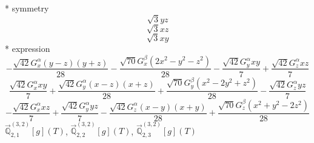 \documentclass[fleqn,8pt]{jsarticle}
\begin{document}
\noindent\quad ** symmetry
\begin{dmath*}
\sqrt{3} y z
\end{dmath*}
\begin{dmath*}
\sqrt{3} x z
\end{dmath*}
\begin{dmath*}
\sqrt{3} x y
\end{dmath*}
\noindent\quad ** expression
\begin{dmath*}
- \frac{\sqrt{42} G_{x}^{\alpha} \left(y - z\right) \left(y + z\right)}{28} - \frac{\sqrt{70} G_{x}^{\beta} \left(2 x^{2} - y^{2} - z^{2}\right)}{28} - \frac{\sqrt{42} G_{y}^{\alpha} x y}{7} + \frac{\sqrt{42} G_{z}^{\alpha} x z}{7}
\end{dmath*}
\begin{dmath*}
\frac{\sqrt{42} G_{x}^{\alpha} x y}{7} + \frac{\sqrt{42} G_{y}^{\alpha} \left(x - z\right) \left(x + z\right)}{28} + \frac{\sqrt{70} G_{y}^{\beta} \left(x^{2} - 2 y^{2} + z^{2}\right)}{28} - \frac{\sqrt{42} G_{z}^{\alpha} y z}{7}
\end{dmath*}
\begin{dmath*}
- \frac{\sqrt{42} G_{x}^{\alpha} x z}{7} + \frac{\sqrt{42} G_{y}^{\alpha} y z}{7} - \frac{\sqrt{42} G_{z}^{\alpha} \left(x - y\right) \left(x + y\right)}{28} + \frac{\sqrt{70} G_{z}^{\beta} \left(x^{2} + y^{2} - 2 z^{2}\right)}{28}
\end{dmath*}
\noindent\quad $\vec{\mathbb{Q}}_{2,1}^{(3,2)}[g](T)$, $\vec{\mathbb{Q}}_{2,2}^{(3,2)}[g](T)$, $\vec{\mathbb{Q}}_{2,3}^{(3,2)}[g](T)$
\end{document}
